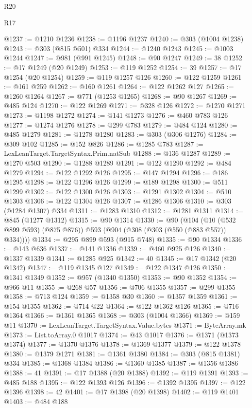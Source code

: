 \begin{lexlean}{R20}
\begin{lexlean}{R17}
\begin{coremodule}
{{{{{{{{{{{{{{{{{{{{{{{{{{{{{{{{{{{{{{{{{{{{{{{{{{{{{{{{{{{{{{{{{{{{{{{{{{{{{{{{{{{{{{{{{{{{{{{{{{{{{{{{{{{@1237 := @1210 @1236
@1238 := @1196 @1237
@1240 := @303 (@1004 @1238)
@1243 := @303 (@815 @501) @334
@1244 := @1240 @1243
@1245 := @1003 @1244
@1247 := @981 (@991 @1245)
@1248 := @90 @1247
@1249 := 38
@1252 := @17 @1249 (@20 @1249)
@1253 := @119 @1252
@1254 := 39
@1257 := @17 @1254 (@20 @1254)
@1259 := @119 @1257 @126
@1260 := @122 @1259
@1261 := @161 @259
@1262 := @160 @1261
@1264 := @122 @1262 @127
@1265 := @1260 @1264
@1267 := @771 (@1253 @1265)
@1268 := @90 @1267
@1269 := @485 @124
@1270 := @122 @1269
@1271 := @328 @126
@1272 := @1270 @1271
@1273 := @1198 @1272
@1274 := @141 @1273
@1276 := @460 @783 @126
@1277 := @1274 @1276
@1278 := @299 @783
@1279 := @484 @124
@1280 := @485 @1279
@1281 := @1278 @1280
@1283 := @303 (@306 @1276)
@1284 := @309 @102
@1285 := @152 @826
@1286 := @1285 @783
@1287 := LexLeanTarget.TargetSyntax.Prim.natSub
@1288 := @136 @1287
@1289 := @1270 @503
@1290 := @1288 @1289
@1291 := @122 @1290
@1292 := @484 @1279
@1294 := @122 @1292 @126
@1295 := @147 @1294
@1296 := @186 @1295
@1298 := @122 @1296 @126
@1299 := @189 @1298
@1300 := @511 @1299
@1302 := @122 @1300 @126
@1303 := @1291 @1302
@1304 := @510 @1303
@1306 := @122 @1304 @126
@1307 := @1286 @1306
@1310 := @303 (@1284 @1307) @334
@1311 := @1283 @1310
@1312 := @1281 @1311
@1314 := @845 (@1277 @1312)
@1315 := @90 @1314
@1330 := @90
    (@104 (@10 (@532 @899 @593) (@875 @876)) @593 (@904 (@308 (@303 (@550 (@883 @557)) @334))))
@1334 := @295 @899 @593 (@915 @748)
@1335 := @90 @1334
@1336 := @143 @636
@1337 := @141 @1336
@1339 := @460 @925 @126
@1340 := @1337 @1339
@1341 := @1285 @925
@1342 := 40
@1345 := @17 @1342 (@20 @1342)
@1347 := @119 @1345 @127
@1349 := @122 @1347 @126
@1350 := @1341 @1349
@1352 := @957 (@1340 @1350)
@1353 := @90 @1352
@1354 := @966 @11
@1355 := @268 @57
@1356 := @706 @1355
@1357 := @299 @1355
@1358 := @713 @124
@1359 := @1358 @30
@1360 := @1357 @1359
@1361 := @154 @1355
@1362 := @714 @22
@1364 := @122 @1362 @126
@1365 := @716 @1364
@1366 := @1361 @1365
@1368 := @303 (@1004 @1366)
@1369 := @159 @11
@1370 := LexLeanTarget.TargetSyntax.Value.bytes
@1371 := ByteArray.mk
@1373 := List.toArray.{0} @1017
@1374 := @43 @1017
@1376 := @1371 (@1373 @1374)
@1377 := @1370 @1376
@1378 := @1369 @1377
@1379 := @122 @1378
@1380 := @1379 @1271
@1381 := @1361 @1380
@1384 := @303 (@815 @1381) @334
@1385 := @1368 @1384
@1386 := @1360 @1385
@1387 := @1356 @1386
@1388 := 41
@1391 := @17 @1388 (@20 @1388)
@1392 := @119 @1391
@1393 := @485 @188
@1395 := @122 @1393 @126
@1396 := @1392 @1395
@1397 := @122 @1396
@1398 := 42
@1401 := @17 @1398 (@20 @1398)
@1402 := @119 @1401
@1403 := @484 @188
}}}}}}}}}}}}}}}}}}}}}}}}}}}}}}}}}}}}}}}}}}}}}}}}}}}}}}}}}}}}}}}}}}}}}}}}}}}}}}}}}}}}}}}}}}}}}}}}}}}}}}}}}}}
\end{coremodule}
\end{lexlean}
\end{lexlean}
